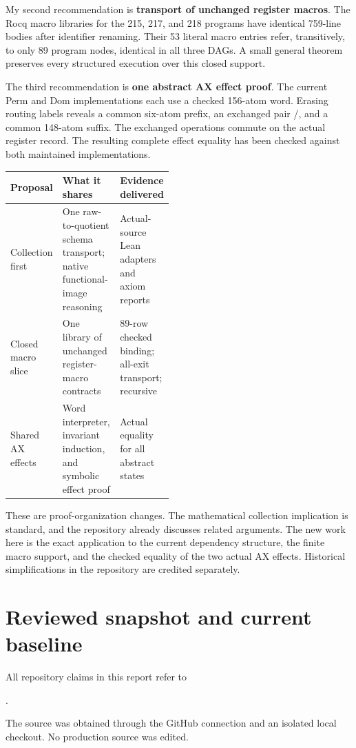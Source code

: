 \documentclass[11pt,letterpaper]{article}
\newcommand{\code}[1]{\texttt{\detokenize{#1}}}
\begin{document}
My second recommendation is \textbf{transport of unchanged register macros}.
The Rocq macro libraries for the 215, 217, and 218 programs have identical
759-line bodies after identifier renaming. Their 53 literal macro entries
refer, transitively, to only 89 program nodes, identical in all three DAGs.
A small general theorem preserves every structured execution over this
closed support.

The third recommendation is \textbf{one abstract AX effect proof}. The current
Perm and Dom implementations each use a checked 156-atom word. Erasing routing
labels reveals a common six-atom prefix, an exchanged pair
\code{cons}/\code{readp1}, and a common 148-atom suffix. The exchanged operations
commute on the actual register record. The resulting complete effect equality
has been checked against both maintained implementations.

\begin{center}
\begin{tabularx}{\linewidth}{@{}L{0.20\linewidth}YL{0.27\linewidth}@{}}
\toprule
Proposal & What it shares & Evidence delivered\\
\midrule
Collection first & One raw-to-quotient schema transport; native functional-image reasoning &
Actual-source Lean adapters and axiom reports\\
Closed macro slice & One library of unchanged register-macro contracts &
89-row checked binding; all-exit transport; recursive \code{coqchk}\\
Shared AX effects & Word interpreter, invariant induction, and symbolic effect proof &
Actual \code{f236} equality for all abstract states\\
\bottomrule
\end{tabularx}
\end{center}

These are proof-organization changes. The mathematical collection implication
is standard, and the repository already discusses related arguments. The new
work here is the exact application to the current dependency structure,
the finite macro support, and the checked equality of the two actual AX
effects. Historical simplifications in the repository are credited separately.

\section{Reviewed snapshot and current baseline}

All repository claims in this report refer to
\begin{center}
\small{}.
\end{center}
The source was obtained through the GitHub connection and an isolated local
checkout. No production source was edited.
\end{document}
